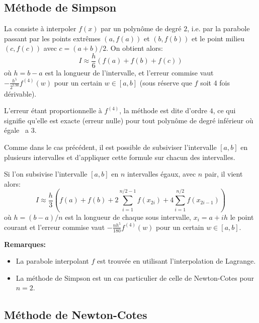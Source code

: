 \medskip
\subsection*{Méthode de Simpson}

La   consiste à interpoler $f(x)$ par un polynôme 
de degré $2$, i.e. par la parabole passant par les points extrêmes $(a,f(a))$ et $(b,f(b))$ 
et le point milieu $(c,f(c))$ avec $c=(a+b)/2$.
On obtient alors:
\begin{equation} I\approx \frac{h}{6} \left( f(a)+f(b)+f(c)\right)\end{equation}
où $h=b-a$ est la longueur de l'intervalle,
et l'erreur commise vaut $-\frac{h^5}{2^5.90} f^{(4)}(w)$ pour un certain $w\in[a,b]$
(sous réserve que $f$ soit 4 fois dérivable).

L'erreur étant proportionnelle à $f^{(4)}$, la méthode est dite d'ordre $4$, ce qui
signifie qu'elle est exacte (erreur nulle) pour tout polynôme de degré inférieur
où égale \ a 3.

\medskip
Comme dans le cas préc\'edent, il est possible de subsiviser l'intervalle $[a,b]$ en plusieurs intervalles 
et d'appliquer cette formule sur chacun des intervalles.

Si l'on subsivise l'intervalle $[a,b]$ en $n$ intervalles égaux, avec $n$ pair, il vient alors:
\begin{equation} I\approx \frac{h}{3} \left( f(a)+f(b)+2\sum_{i=1}^{n/2-1}f(x_{2i})+4\sum_{i=1}^{n/2}f(x_{2i-1})
\right)\end{equation}
où $h=(b-a)/n$ est la longueur de chaque sous intervalle, $x_i=a+ih$ le
point courant et l'erreur commise vaut $-\frac{nh^5}{180} f^{(4)}(w)$ pour un certain $w\in[a,b]$.

\medskip
\textbf{Remarques:}
\begin{itemize}
\item La parabole interpolant $f$ est trouvée en utilisant l'interpolation de Lagrange.
\item La méthode de Simpson est un cas particulier de 
	celle de Newton-Cotes pour $n=2$.
\end{itemize}


\medskip
\subsection*{Méthode de Newton-Cotes}

